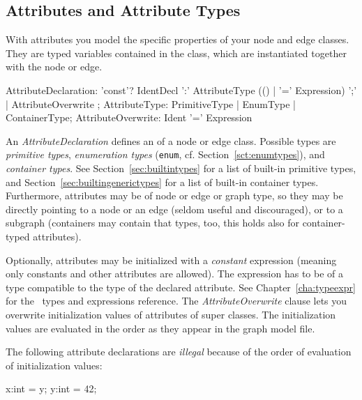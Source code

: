 \pagebreak

\subsection{Attributes and Attribute Types}
\label{sct:attrtypes}

With attributes you model the specific properties of your node and edge classes.
They are typed variables contained in the class, which are instantiated together with the node or edge.

\begin{rail}
  AttributeDeclaration: 'const'? IdentDecl ':' AttributeType (() | '=' Expression) ';' | AttributeOverwrite ;
  AttributeType: PrimitiveType | EnumType | ContainerType;
  AttributeOverwrite: Ident '=' Expression
\end{rail}

An \emph{AttributeDeclaration} defines an  of a node or edge class.
Possible types are \emph{primitive types}, \emph{enumeration types} (\texttt{enum}, cf. Section~\ref{sct:enumtypes}), and \emph{container types}.
See Section~\ref{sec:builtintypes} for a list of built-in primitive types, and Section~\ref{sec:builtingenerictypes} for a list of built-in container types.
Furthermore, attributes may be of node or edge or graph type, so they may be directly pointing to a node or an edge (seldom useful and discouraged), or to a subgraph (containers may contain that types, too, this holds also for container-typed attributes).

Optionally, attributes may be initialized with a \emph{constant} expression (meaning only constants and other attributes are allowed).
The expression has to be of a type compatible to the type of the declared attribute.
See Chapter~\ref{cha:typeexpr} for the \GrG\ types and expressions reference.
The \emph{AttributeOverwrite} clause lets you overwrite initialization values of attributes of super classes.
The initialization values are evaluated in the order as they appear in the graph model file.

\begin{warning}
	The following attribute declarations are \emph{illegal} because of the order of evaluation of initialization values:
	\begin{grgen}
x:int = y;
y:int = 42;
	\end{grgen}
\end{warning}


